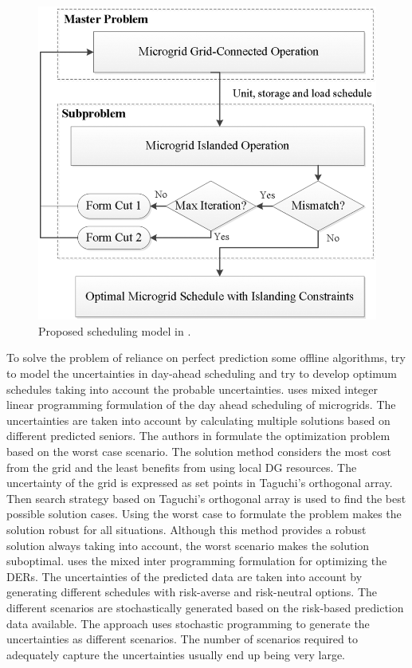 \begin{figure}[!h]
\centering
\includegraphics[width=0.5\linewidth]{figs/OFF_2.png}
\caption[Proposed scheduling model]{Proposed scheduling model  in \cite{AKh14}.}
\label{fig:OFF_2}
\end{figure}

To solve the problem of reliance on perfect prediction some offline algorithms, try to model the uncertainties in day-ahead scheduling and try to develop optimum schedules taking into account the probable uncertainties.
\cite{Has17} uses mixed integer linear programming formulation of the day ahead scheduling of microgrids. The uncertainties are taken into account by calculating multiple solutions based on different predicted seniors. 
The authors in \cite{Yue16} formulate the optimization problem based on the worst case scenario. The solution method considers the most cost from the grid and the least benefits from using local DG resources. The uncertainty of the grid is expressed as set points in Taguchi’s orthogonal array. Then search strategy based on Taguchi’s orthogonal array is used to find the best possible solution cases. Using the worst case to formulate the problem makes the solution robust for all situations. Although this method provides a robust solution always taking into account, the worst scenario makes the solution suboptimal.
\cite{FFa15} uses the mixed inter programming formulation for optimizing the DERs. The uncertainties of the predicted data are taken into account by generating different schedules with risk-averse and risk-neutral options. The different scenarios are stochastically generated based on the risk-based prediction data available. The approach uses stochastic programming to generate the uncertainties as different scenarios. The number of scenarios required to adequately capture the uncertainties usually end up being very large. 

